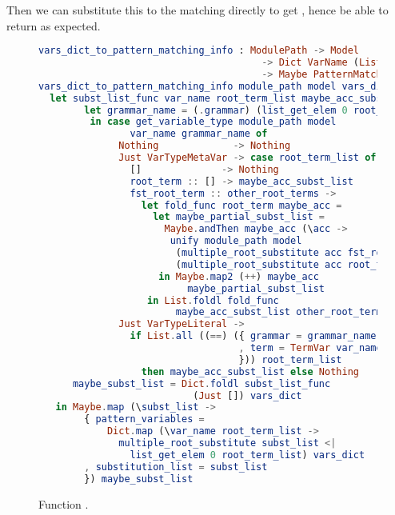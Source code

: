 \documentclass[master.tex]{subfiles}
\begin{document}
Then we can substitute this  to the matching directly to
get , hence be able to return
 as expected.

\begin{figure}[H]
\begin{framed}
\begin{lstlisting}[language=elm,basicstyle=\footnotesize\ttfamily]
vars_dict_to_pattern_matching_info : ModulePath -> Model
                                       -> Dict VarName (List RootTerm)
                                       -> Maybe PatternMatchingInfo
vars_dict_to_pattern_matching_info module_path model vars_dict =
  let subst_list_func var_name root_term_list maybe_acc_subst_list =
        let grammar_name = (.grammar) (list_get_elem 0 root_term_list)
         in case get_variable_type module_path model
                var_name grammar_name of
              Nothing             -> Nothing
              Just VarTypeMetaVar -> case root_term_list of
                []              -> Nothing
                root_term :: [] -> maybe_acc_subst_list
                fst_root_term :: other_root_terms ->
                  let fold_func root_term maybe_acc =
                    let maybe_partial_subst_list =
                      Maybe.andThen maybe_acc (\acc ->
                       unify module_path model
                        (multiple_root_substitute acc fst_root_term)
                        (multiple_root_substitute acc root_term))
                     in Maybe.map2 (++) maybe_acc
                          maybe_partial_subst_list
                   in List.foldl fold_func
                        maybe_acc_subst_list other_root_terms
              Just VarTypeLiteral ->
                if List.all ((==) ({ grammar = grammar_name
                                   , term = TermVar var_name
                                   })) root_term_list
                  then maybe_acc_subst_list else Nothing
      maybe_subst_list = Dict.foldl subst_list_func
                           (Just []) vars_dict
   in Maybe.map (\subst_list ->
        { pattern_variables =
            Dict.map (\var_name root_term_list ->
              multiple_root_substitute subst_list <|
                list_get_elem 0 root_term_list) vars_dict
        , substitution_list = subst_list
        }) maybe_subst_list
\end{lstlisting}
\end{framed}
\caption{Function .}
\end{figure}
\end{document}
